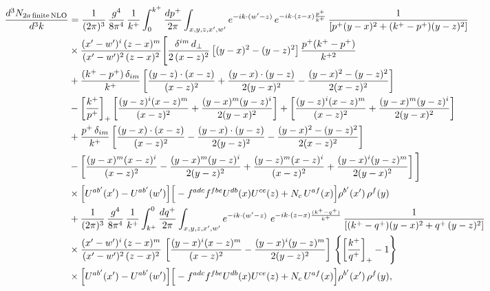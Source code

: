 \documentclass[10pt]{article}
\numberwithin{equation}{section}
\begin{document}
\begin{align}
    \frac{d^{3}N_{2a\,\rm finite\,NLO}}{d^{3}k} & = \frac{1}{(2\pi)^{3}}\,\frac{g^{4}}{8\pi^{4}}\,\frac{1}{k^{+}}\int_{0}^{k^{+}}\frac{dp^{+}}{2\pi}\int_{x,y,z,x',w'}e^{-ik\cdot(w'-z)}\,e^{-ik\cdot(z-x)\frac{p^{+}}{k^{+}}}\,\frac{1}{\left[p^{+}(y-x)^{2}+(k^{+}-p^{+})(y-z)^{2}\right]}\notag \\ & \times\frac{(x'-w')^{i}\,(z-x)^{m}}{(x'-w')^{2}\,(z-x)^{2}}\Bigg[\frac{\delta^{im}\,d_{\perp}}{2\,(x-z)^{2}}\left[(y-x)^{2}-(y-z)^{2}\right]\frac{p^{+}(k^{+}-p^{+})}{k^{+2}}\notag\\
&+\frac{(k^{+}-p^{+})\,\delta_{im}}{k^{+}}\left[\frac{(y-z)\cdot(x-z)}{(x-z)^{2}}+\frac{(y-x)\cdot(y-z)}{2(y-x)^{2}}-\frac{(y-x)^{2}-(y-z)^{2}}{2(x-z)^{2}}\right]\notag\\
&-\left[\frac{k^{+}}{p^{+}}\right]_{+}\left[\frac{(y-z)^{i}(x-z)^{m}}{(x-z)^{2}}+\frac{(y-x)^{m}(y-z)^{i}}{2(y-x)^{2}}\right]+\left[\frac{(y-z)^{i}(x-z)^{m}}{(x-z)^{2}}+\frac{(y-x)^{m}(y-z)^{i}}{2(y-x)^{2}}\right]\notag\\
&+\frac{p^{+}\,\delta_{im}}{k^{+}}\left[\frac{(y-x)\cdot(x-z)}{(x-z)^{2}}-\frac{(y-x)\cdot(y-z)}{2(y-z)^{2}}-\frac{(y-x)^{2}-(y-z)^{2}}{2(x-z)^{2}}\right]\notag\\
&-\left[\frac{(y-x)^{m}(x-z)^{i}}{(x-z)^{2}}-\frac{(y-x)^{m}(y-z)^{i}}{2(y-z)^{2}}+\frac{(y-z)^{m}(x-z)^{i}}{(x-z)^{2}}+\frac{(y-x)^{i}(y-z)^{m}}{2(y-x)^{2}}\right]\Bigg]\notag\\
&\times\Big[U^{ab'}(x')-U^{ab'}(w')\Big]\Big[-f^{adc}f^{fbe}U^{db}(x)U^{ce}(z)+N_{c}\,U^{af}(x)\Big]\rho^{b'}(x')\,\rho^{f}(y)\notag \\ & + \frac{1}{(2\pi)^{3}}\,\frac{g^{4}}{8\pi^{4}}\,\frac{1}{k^{+}}\int_{k^{+}}^{0}\frac{dq^{+}}{2\pi}\int_{x,y,z,x',w'}e^{-ik\cdot(w'-z)}\ e^{-ik\cdot(z-x)\frac{(k^{+}-q^{+})}{k^{+}}}\,\frac{1}{\left[(k^{+}-q^{+})(y-x)^{2}+q^{+}\,(y-z)^{2}\right]}\notag \\ & \times\frac{(x'-w')^{i}\,(z-x)^{m}}{(x'-w')^{2}\,(z-x)^{2}}\,\left[\frac{(y-x)^{i}(x-z)^{m}}{(x-z)^{2}}-\frac{(y-x)^{i}(y-z)^{m}}{2(y-z)^{2}}\right]\,\left\{\left[\frac{k^{+}}{q^{+}}\right]_{+}-1\right\}\notag \\ & \times\Big[U^{ab'}(x')-U^{ab'}(w')\Big]\Big[-f^{adc}f^{fbe}U^{db}(x)U^{ce}(z)+N_{c}\,U^{af}(x)\Big]\rho^{b'}(x')\,\rho^{f}(y),
\label{eq:N2afin}
\end{align}
\end{document}
